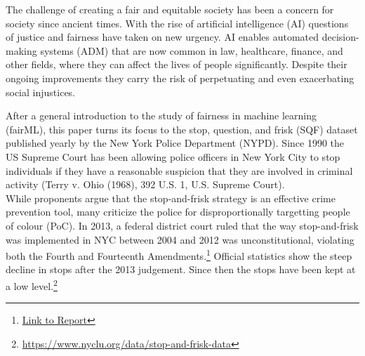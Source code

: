 
The challenge of creating a fair and equitable society has been a concern for society since ancient times. With the rise of artificial intelligence (AI) questions of justice and fairness have taken on new urgency. AI enables automated decision-making systems (ADM) that are now common in law, healthcare, finance, and other fields, where they can affect the lives of people significantly. Despite their ongoing improvements they carry the risk of perpetuating and even exacerbating social injustices.\par

After a general introduction to the study of fairness in machine learning (fairML), this paper turns its focus to the stop, question, and frisk (SQF) dataset published yearly by the New York Police Department (NYPD). Since 1990 the US Supreme Court has been allowing police officers in New York City to stop individuals if they have a reasonable suspicion that they are involved in criminal activity (Terry v. Ohio (1968), 392 U.S. 1, U.S. Supreme Court).\\
While proponents argue that the stop-and-frisk strategy is an effective crime prevention tool, many criticize the police for disproportionally targetting people of colour (PoC).
In 2013, a federal district court ruled that the way stop-and-frisk was implemented in NYC between 2004 and 2012 was unconstitutional, violating both the Fourth and Fourteenth Amendments.\footnote{\href{https://www.policinginstitute.org/wp-content/uploads/2018/07/5-THINGS-Stop\_Question\_Frisk.pdf}{Link to Report}}
Official statistics show the steep decline in stops after the 2013 judgement. Since then the stops have been kept at a low level.\footnote{\href{https://www.nyclu.org/data/stop-and-frisk-data}{https://www.nyclu.org/data/stop-and-frisk-data}}




